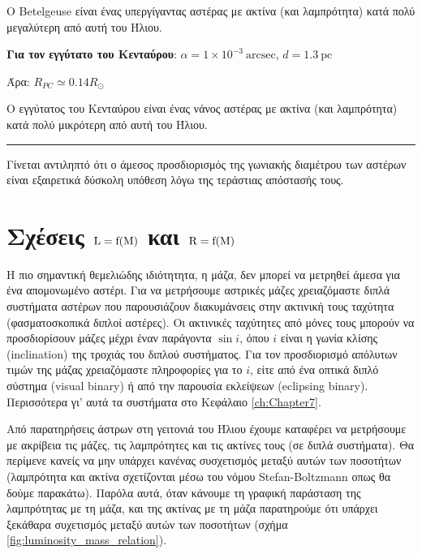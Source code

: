 O Betelgeuse είναι ένας υπεργίγαντας αστέρας με ακτίνα (και λαμπρότητα) κατά πολύ μεγαλύτερη από αυτή του Ήλιου.

\textbf{Για τον εγγύτατο του Κενταύρου}: $\alpha = 1 \times 10^{-3} \ \text{arcsec}$, $d = 1.3 \ \text{pc}$

Άρα: $R_{PC} \simeq 0.14 R_{\odot}$

Ο εγγύτατος του Κενταύρου είναι ένας νάνος αστέρας με ακτίνα (και λαμπρότητα) κατά πολύ μικρότερη από αυτή του Ήλιου.
{\color{red} \hrule}

Γίνεται αντιληπτό ότι ο άμεσος προσδιορισμός της γωνιακής διαμέτρου των αστέρων είναι εξαιρετικά δύσκολη υπόθεση λόγω της τεράστιας απόστασής τους.


\section{Σχέσεις $\rm L = f(M)$ και $\rm R = f(M)$}
Η πιο σημαντική θεμελιώδης ιδιότητητα, η μάζα, δεν μπορεί να μετρηθεί άμεσα για ένα απομονωμένο αστέρι. Για να μετρήσουμε αστρικές μάζες χρειαζόμαστε διπλά συστήματα αστέρων που παρουσιάζουν διακυμάνσεις στην ακτινική τους ταχύτητα (φασματοσκοπικά διπλοί αστέρες). Οι ακτινικές ταχύτητες από μόνες τους μπορούν να προσδιορίσουν μάζες μέχρι έναν παράγοντα $\sin i$, όπου $i$ είναι η γωνία κλίσης (inclination) της τροχιάς του διπλού συστήματος. Για τον προσδιορισμό απόλυτων τιμών της μάζας χρειαζόμαστε πληροφορίες για το $i$, είτε από ένα οπτικά διπλό σύστημα (visual binary) ή από την παρουσία εκλείψεων (eclipsing binary). Περισσότερα γι' αυτά τα συστήματα στο Κεφάλαιο  \ref{ch:Chapter7}. 

Από παρατηρήσεις άστρων στη γειτονιά του Ήλιου έχουμε καταφέρει να μετρήσουμε με ακρίβεια τις μάζες, τις λαμπρότητες και τις ακτίνες τους (σε διπλά συστήματα). Θα περίμενε κανείς να μην υπάρχει κανένας συσχετισμός μεταξύ αυτών των ποσοτήτων (λαμπρότητα και ακτίνα σχετίζονται μέσω του νόμου Stefan-Boltzmann οπως θα δούμε παρακάτω). Παρόλα αυτά, όταν κάνουμε τη γραφική παράσταση της λαμπρότητας με τη μάζα, και της ακτίνας με τη μάζα παρατηρούμε ότι υπάρχει ξεκάθαρα συχετισμός μεταξύ αυτών των ποσοτήτων (σχήμα \ref{fig:luminosity_mass_relation}).

